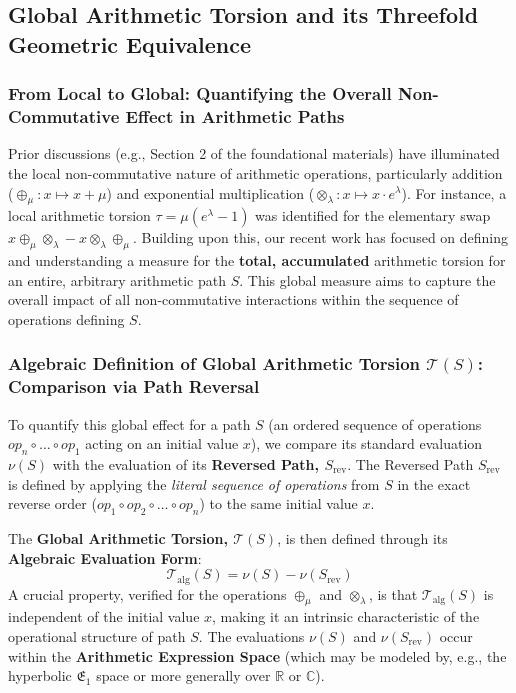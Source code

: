 \subsection{Global Arithmetic Torsion and its Threefold Geometric Equivalence}
\label{sec:global_torsion_formal}

\subsubsection*{From Local to Global: Quantifying the Overall Non-Commutative Effect in Arithmetic Paths}

Prior discussions (e.g., Section 2 of the foundational materials) have illuminated the local non-commutative nature of arithmetic operations, particularly addition ($\oplus_\mu: x \mapsto x+\mu$) and exponential multiplication ($\otimes_\lambda: x \mapsto x \cdot e^\lambda$). For instance, a local arithmetic torsion $\tau = \mu(e^\lambda-1)$ was identified for the elementary swap $x \oplus_\mu \otimes_\lambda - x \otimes_\lambda \oplus_\mu$. Building upon this, our recent work has focused on defining and understanding a measure for the \textbf{total, accumulated} arithmetic torsion for an entire, arbitrary arithmetic path $S$. This global measure aims to capture the overall impact of all non-commutative interactions within the sequence of operations defining $S$.

\subsubsection*{Algebraic Definition of Global Arithmetic Torsion $\mathcal{T}(S)$: Comparison via Path Reversal}

To quantify this global effect for a path $S$ (an ordered sequence of operations $op_n \circ \dots \circ op_1$ acting on an initial value $x$), we compare its standard evaluation $\nu(S)$ with the evaluation of its \textbf{Reversed Path, $S_{\text{rev}}$}. The Reversed Path $S_{\text{rev}}$ is defined by applying the \textit{literal sequence of operations} from $S$ in the exact reverse order ($op_1 \circ op_2 \circ \dots \circ op_n$) to the same initial value $x$.

The \textbf{Global Arithmetic Torsion, $\mathcal{T}(S)$}, is then defined through its \textbf{Algebraic Evaluation Form}:
\begin{equation}
\mathcal{T}_{\text{alg}}(S) = \nu(S) - \nu(S_{\text{rev}})
\label{eq:T_alg_formal}
\end{equation}
A crucial property, verified for the operations $\oplus_\mu$ and $\otimes_\lambda$, is that $\mathcal{T}_{\text{alg}}(S)$ is independent of the initial value $x$, making it an intrinsic characteristic of the operational structure of path $S$. The evaluations $\nu(S)$ and $\nu(S_{\text{rev}})$ occur within the \textbf{Arithmetic Expression Space} (which may be modeled by, e.g., the hyperbolic $\mathfrak{E}_1$ space or more generally over $\mathbb{R}$ or $\mathbb{C}$).

